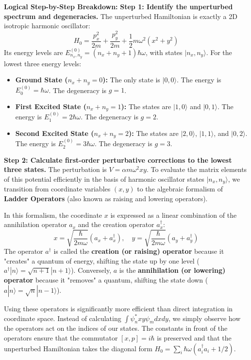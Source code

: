 \begin{solution}
\textbf{Logical Step-by-Step Breakdown:}
\textbf{Step 1: Identify the unperturbed spectrum and degeneracies.}
The unperturbed Hamiltonian is exactly a 2D isotropic harmonic oscillator:
\begin{equation*}
    H_0 = \frac{p_x^2}{2m} + \frac{p_y^2}{2m} + \frac{1}{2}m\omega^2 (x^2 + y^2)
\end{equation*}
Its energy levels are $E_{n_x, n_y}^{(0)} = \left(n_x + n_y + 1\right) \hbar\omega$, with states $|n_x, n_y\rangle$.
For the lowest three energy levels:
\begin{itemize}
    \item \textbf{Ground State ($n_x+n_y=0$):} The only state is $|0, 0\rangle$. The energy is $E_0^{(0)} = \hbar\omega$. The degeneracy is $g = 1$.
    \item \textbf{First Excited State ($n_x+n_y=1$):} The states are $|1, 0\rangle$ and $|0, 1\rangle$. The energy is $E_1^{(0)} = 2\hbar\omega$. The degeneracy is $g = 2$.
    \item \textbf{Second Excited State ($n_x+n_y=2$):} The states are $|2, 0\rangle$, $|1, 1\rangle$, and $|0, 2\rangle$. The energy is $E_2^{(0)} = 3\hbar\omega$. The degeneracy is $g = 3$.
\end{itemize}

\textbf{Step 2: Calculate first-order perturbative corrections to the lowest three states.}
The perturbation is $V = \alpha m\omega^2 x y$. To evaluate the matrix elements of this potential efficiently in the basis of harmonic oscillator states $|n_x, n_y\rangle$, we transition from coordinate variables $(x, y)$ to the algebraic formalism of \textbf{Ladder Operators} (also known as raising and lowering operators).

In this formalism, the coordinate $x$ is expressed as a linear combination of the annihilation operator $a_x$ and the creation operator $a_x^\dagger$:
\begin{equation*}
    x = \sqrt{\frac{\hbar}{2m\omega}} (a_x + a_x^\dagger), \quad y = \sqrt{\frac{\hbar}{2m\omega}} (a_y + a_y^\dagger)
\end{equation*}
The operator $a^\dagger$ is called the \textbf{creation (or raising) operator} because it "creates" a quantum of energy, shifting the state up by one level ($a^\dagger |n\rangle = \sqrt{n+1} |n+1\rangle$). Conversely, $a$ is the \textbf{annihilation (or lowering) operator} because it "removes" a quantum, shifting the state down ($a |n\rangle = \sqrt{n} |n-1\rangle$).

Using these operators is significantly more efficient than direct integration in coordinate space. Instead of calculating $\int \psi_n^* x y \psi_m dx dy$, we simply observe how the operators act on the indices of our states. The constants in front of the operators ensure that the commutator $[x, p] = i\hbar$ is preserved and that the unperturbed Hamiltonian takes the diagonal form $H_0 = \sum_i \hbar\omega (a_i^\dagger a_i + 1/2)$.


\end{solution}
